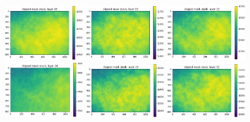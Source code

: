 \documentclass[letterpaper,11pt]{article}
\begin{document}
\begin{figure}[!ht]
\includegraphics[width=0.3\textwidth]{images/measuring_flatfield_corrections/clipped_mask_stack_layers/clipped_mask_stack_layer_19}
\includegraphics[width=0.3\textwidth]{images/measuring_flatfield_corrections/clipped_mask_stack_layers/clipped_mask_stack_layer_22}
\includegraphics[width=0.3\textwidth]{images/measuring_flatfield_corrections/clipped_mask_stack_layers/clipped_mask_stack_layer_25}
\includegraphics[width=0.3\textwidth]{images/measuring_flatfield_corrections/clipped_mask_stack_layers/clipped_mask_stack_layer_26}
\includegraphics[width=0.3\textwidth]{images/measuring_flatfield_corrections/clipped_mask_stack_layers/clipped_mask_stack_layer_29}
\includegraphics[width=0.3\textwidth]{images/measuring_flatfield_corrections/clipped_mask_stack_layers/clipped_mask_stack_layer_32}

\end{figure}
\end{document}
